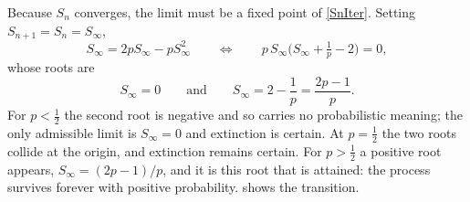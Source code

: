 Because $S_n$ converges, the limit must be a fixed point of \cref{SnIter}. Setting
$S_{n+1}=S_n=S_\infty$,
\begin{equation*}
S_\infty = 2p S_\infty - p S_\infty^2
\qquad\Longleftrightarrow\qquad
p\,S_\infty\bigl(S_\infty + \tfrac1p - 2\bigr) = 0,
\end{equation*}
whose roots are
\begin{equation*}
S_\infty = 0
\qquad\text{and}\qquad
S_\infty = 2 - \frac1p = \frac{2p-1}{p}.
\end{equation*}
For $p<\tfrac12$ the second root is negative and so carries no probabilistic
meaning; the only admissible limit is $S_\infty=0$ and extinction is certain. At
$p=\tfrac12$ the two roots collide at the origin, and extinction remains certain.
For $p>\tfrac12$ a positive root appears, $S_\infty = (2p-1)/p$, and it is this root
that is attained: the process survives forever with positive probability.
 shows the transition.

